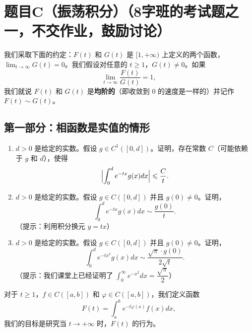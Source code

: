 \section{题目C（振荡积分）（8字班的考试题之一，不交作业，鼓励讨论）}

我们采取下面的约定：$F(t)$ 和 $G(t)$ 是 $[1,+\infty)$ 上定义的两个函数，$\displaystyle  \lim_{t\rightarrow \infty}G(t)=0$。我们假设对任意的 $t\geqslant 1$，$G(t)\neq 0$。如果
\[\lim_{t\rightarrow \infty}\frac{F(t)}{G(t)}=1,\]
我们就说 $F(t)$ 和 $G(t)$ 是{\bf 均阶的}（即收敛到 $0$ 的速度是一样的）并记作 $F(t)\sim G(t)$。

\subsection{第一部分：相函数是实值的情形}

\begin{enumerate}[label=C\arabic*)]
\item $d>0$ 是给定的实数。假设 $g\in C^1([0,d])$。证明，存在常数 $C$（可能依赖于 $g$ 和 $d$），使得
\[\Bigl|\int_0^d e^{-tx}g(x)dx\Bigr| \leqslant \frac{C}{t}.\]

\item $d>0$ 是给定的实数。假设 $g\in C([0,d])$ 并且 $g(0)\neq 0$。证明，
\[\int_0^d e^{-tx}g(x)dx \sim \frac{g(0)}{t} .\]
（提示：利用积分换元 $y=tx$）

\item $d>0$ 是给定的实数。假设 $g\in C([0,d])$ 并且 $g(0)\neq 0$。证明，
\[\int_0^d e^{-tx^2}g(x)dx \sim \frac{\sqrt{\pi}\cdot g(0)}{2\sqrt{t}} .\]
（提示：我们课堂上已经证明了 $\displaystyle \int_0^\infty e^{-x^2}dx=\dfrac{\sqrt{\pi}}{2}$）
\end{enumerate}

对于 $t\geqslant 1$，$f\in C([a,b])$ 和 $\varphi \in C([a,b])$，我们定义函数
\[F(t)=\int_{a}^b e^{-t\varphi(x)}f(x)dx,\]
我们的目标是研究当 $t\rightarrow +\infty$ 时，$F(t)$ 的行为。


